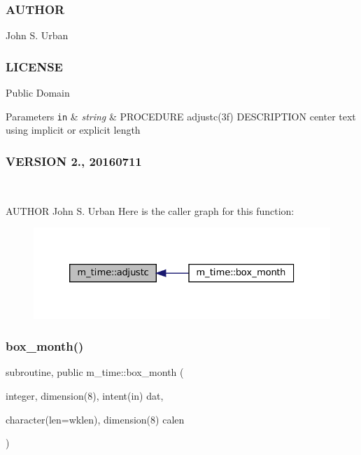  \subsubsection*{A\+U\+T\+H\+OR}

John S. Urban \subsubsection*{L\+I\+C\+E\+N\+SE}

Public Domain


\begin{DoxyParams}[1]{Parameters}
\mbox{\tt in}  & {\em string} & P\+R\+O\+C\+E\+D\+U\+RE adjustc(3f) D\+E\+S\+C\+R\+I\+P\+T\+I\+ON center text using implicit or explicit length \subsubsection*{V\+E\+R\+S\+I\+ON 2., 20160711}\\
\hline
\end{DoxyParams}
A\+U\+T\+H\+OR John S. Urban Here is the caller graph for this function\+:\nopagebreak
\begin{figure}[H]
\begin{center}
\leavevmode
\includegraphics[width=326pt]{namespacem__time_a9b165bc2207c694474bff6c7f56dfb09_icgraph}
\end{center}
\end{figure}
\mbox{\label{namespacem__time_a0fe7540912df30d3578f3c469413aea8}} 
\subsubsection{\texorpdfstring{box\+\_\+month()}{box\_month()}}
{\footnotesize\ttfamily subroutine, public m\+\_\+time\+::box\+\_\+month (\begin{DoxyParamCaption}\item[{integer, dimension(8), intent(in)}]{dat,  }\item[{character(len=wklen), dimension(8)}]{calen }\end{DoxyParamCaption})}



